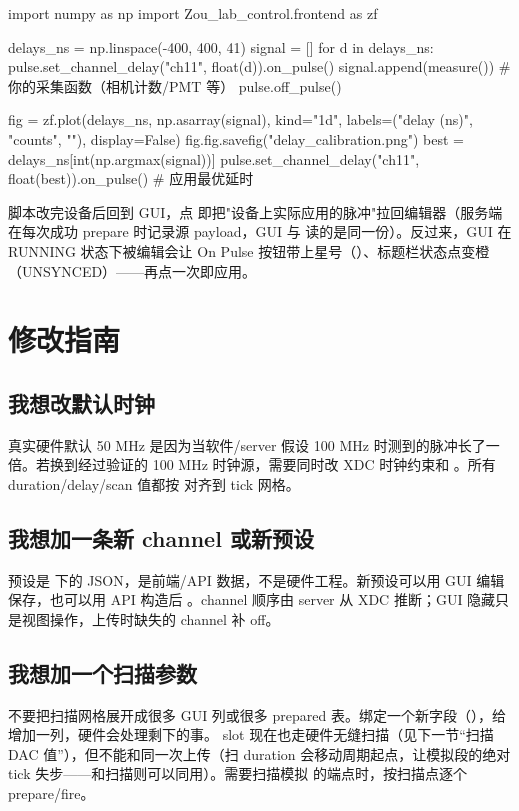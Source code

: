 \documentclass[11pt,oneside,openany]{book}
\begin{document}
\begin{codeblock}
import numpy as np
import Zou_lab_control.frontend as zf

delays_ns = np.linspace(-400, 400, 41)
signal = []
for d in delays_ns:
    pulse.set_channel_delay("ch11", float(d)).on_pulse()
    signal.append(measure())        # 你的采集函数（相机计数/PMT 等）
    pulse.off_pulse()

fig = zf.plot(delays_ns, np.asarray(signal), kind="1d",
              labels=("delay (ns)", "counts", ""), display=False)
fig.fig.savefig("delay_calibration.png")
best = delays_ns[int(np.argmax(signal))]
pulse.set_channel_delay("ch11", float(best)).on_pulse()   # 应用最优延时
\end{codeblock}

\begin{notebox}
脚本改完设备后回到 GUI，点  即把"设备上实际应用的脉冲"拉回编辑器（服务端在每次成功 prepare 时记录源 payload，GUI 与  读的是同一份）。反过来，GUI 在 RUNNING 状态下被编辑会让 On Pulse 按钮带上星号（）、标题栏状态点变橙（UNSYNCED）——再点一次即应用。
\end{notebox}

\chapter{修改指南}

\section{我想改默认时钟}
真实硬件默认 50 MHz 是因为当软件/server 假设 100 MHz 时测到的脉冲长了一倍。若换到经过验证的 100 MHz 时钟源，需要同时改 XDC 时钟约束和 。所有 duration/delay/scan 值都按  对齐到 tick 网格。

\section{我想加一条新 channel 或新预设}
预设是  下的  JSON，是前端/API 数据，不是硬件工程。新预设可以用 GUI 编辑保存，也可以用 API 构造后 。channel 顺序由 server 从 XDC 推断；GUI 隐藏只是视图操作，上传时缺失的 channel 补 off。

\section{我想加一个扫描参数}
不要把扫描网格展开成很多 GUI 列或很多 prepared 表。绑定一个新字段（），给  增加一列，硬件会处理剩下的事。 slot 现在也走硬件无缝扫描（见下一节“扫描 DAC 值”），但不能和同一次上传（扫 duration 会移动周期起点，让模拟段的绝对 tick 失步——和扫描则可以同用）。需要扫描模拟  的端点时，按扫描点逐个 prepare/fire。
\end{document}
